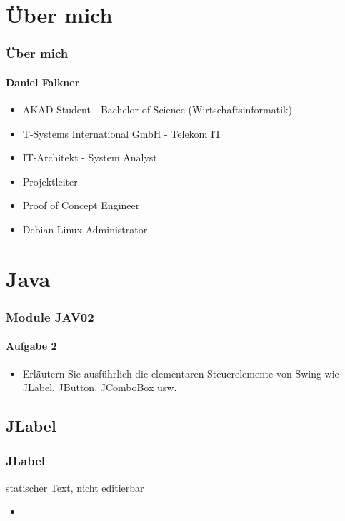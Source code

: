 \documentclass[xcolor=dvipsnames]{beamer}
\subtitle{Modul JAV02} %
\institute{AKAD University} %
\title{\Title}
\author{\Author}
\date{05/06.September.2014}
\begin{document}
\begin{frame}
    \titlepage
\end{frame}




\section{Über mich}
\begin{frame} %
  \frametitle{Über mich} %
  \framesubtitle{Daniel Falkner} %
  \begin{block}{}
	  \begin{itemize}
	  	\item AKAD Student - Bachelor of Science (Wirtschaftsinformatik)
  		\item T-Systems International GmbH - Telekom IT
  		\item IT-Architekt - System Analyst
		\item Projektleiter
		\item Proof of Concept Engineer
  		\item Debian Linux Administrator
	  \end{itemize}
  \end{block}
\end{frame}


\section{Java}
\begin{frame} %
  \frametitle{Module JAV02} %
  \framesubtitle{Aufgabe 2} %
  \begin{block}{}
	  \begin{itemize}
		\item Erläutern Sie ausführlich die elementaren Steuerelemente von Swing wie JLabel, JButton, JComboBox usw.
	  \end{itemize}

  \end{block}
\end{frame}


\subsection{JLabel}
\begin{frame} %
  \frametitle{JLabel} %
  \begin{block}{statischer Text, nicht editierbar}
	  \begin{itemize}
		\item .
	  \end{itemize}
  \end{block}
\end{frame}
\end{document}
